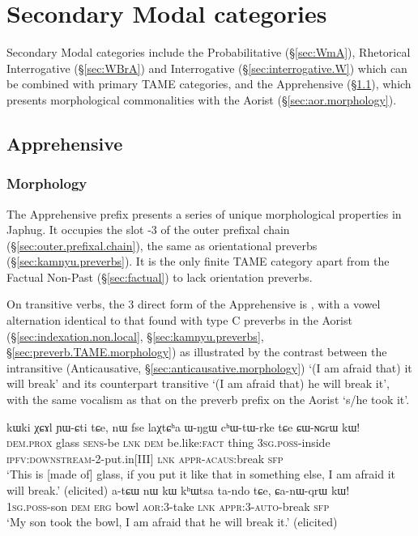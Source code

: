  
\section{Secondary Modal categories}  \label{sec:second.modal}
Secondary Modal categories include the Probabilitative (§\ref{sec:WmA}), Rhetorical Interrogative (§\ref{sec:WBrA}) and Interrogative (§\ref{sec:interrogative.W}) which can be combined with primary TAME categories, and the Apprehensive (§\ref{sec:apprehensive}), which presents morphological commonalities with the Aorist (§\ref{sec:aor.morphology}).

  \subsection{Apprehensive} \label{sec:apprehensive}
  
    \subsubsection{Morphology} \label{sec:apprehensive.morphology}
The Apprehensive prefix  presents a series of unique morphological properties in Japhug. It occupies the slot -3 of the outer prefixal chain (§\ref{sec:outer.prefixal.chain}), the same as orientational preverbs (§\ref{sec:kamnyu.preverbs}). It is the only finite TAME category apart from the Factual Non-Past (§\ref{sec:factual}) to lack orientation preverbs.

On transitive verbs, the 3\flobv{} direct form of the Apprehensive is , with a vowel alternation identical to that found with type C preverbs in the Aorist (§\ref{sec:indexation.non.local}, §\ref{sec:kamnyu.preverbs}, §\ref{sec:preverb.TAME.morphology}) as illustrated by the contrast between the intransitive (Anticausative, §\ref{sec:anticausative.morphology})  `(I am afraid that) it will break' and its counterpart transitive  `(I am afraid that) he will break it', with the same vocalism as that on the preverb  prefix on the Aorist   `s/he took it'.

\begin{exe}
\ex \label{ex:NGrW.qrW}
\begin{xlist}
\ex \label{ex:CWNGrW}
\gll kɯki χɕɤl ɲɯ-ɕti tɕe, nɯ fse laχtɕʰa ɯ-ŋgɯ cʰɯ-tɯ-rke tɕe ɕɯ-ɴɢrɯ kɯ!  \\
\textsc{dem}.\textsc{prox} glass \textsc{sens}-be \textsc{lnk} \textsc{dem} be.like:\textsc{fact}  thing \textsc{3sg}.\textsc{poss}-inside \textsc{ipfv}:\textsc{downstream}-2-put.in[III] \textsc{lnk} \textsc{appr}-\textsc{acaus}:break \textsc{sfp} \\
\glt `This is [made of] glass, if you put it like that in something else, I am afraid it will break.' (elicited)
\ex \label{ex:CanWqrW}
\gll a-tɕɯ nɯ kɯ kʰɯtsa ta-ndo tɕe, ɕa-nɯ-qrɯ kɯ! \\
\textsc{1sg}.\textsc{poss}-son \textsc{dem} \textsc{erg} bowl \textsc{aor}:3\flobv{}-take \textsc{lnk} \textsc{appr}:3\flobv{}-\textsc{auto}-break \textsc{sfp} \\
\glt `My son took the bowl, I am afraid that he will break it.' (elicited)
\end{xlist}
 \end{exe}
 

